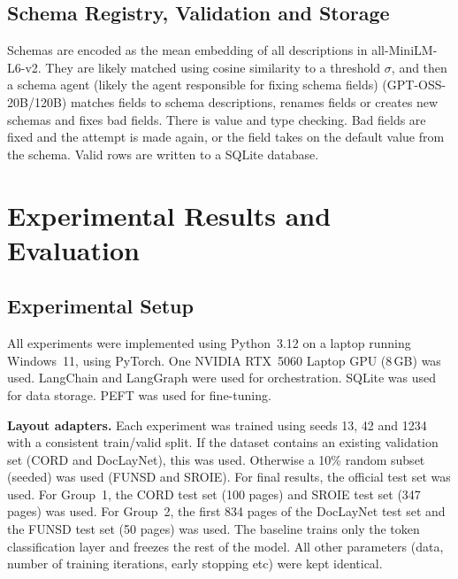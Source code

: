 \documentclass[conference]{IEEEtran}
\begin{document}
\subsection{Schema Registry, Validation and Storage}

Schemas are encoded as the mean embedding of all descriptions in all-MiniLM-L6-v2. They are likely matched using cosine similarity to a threshold $\sigma$, and then a schema agent (likely the agent responsible for fixing schema fields) (GPT-OSS-20B/120B) matches fields to schema descriptions, renames fields or creates new schemas and fixes bad fields. There is value and type checking. Bad fields are fixed and the attempt is made again, or the field takes on the default value from the schema. Valid rows are written to a SQLite database.

\section{Experimental Results and Evaluation}
\label{sec:eval}

\subsection{Experimental Setup}

All experiments were implemented using Python~3.12 on a laptop running Windows~11, using PyTorch. One NVIDIA RTX~5060 Laptop GPU (8\,GB) was used. LangChain and LangGraph were used for orchestration. SQLite was used for data storage. PEFT was used for fine-tuning.

\textbf{Layout adapters.} Each experiment was trained using seeds 13, 42 and 1234 with a consistent train/valid split. If the dataset contains an existing validation set (CORD and DocLayNet), this was used. Otherwise a 10\% random subset (seeded) was used (FUNSD and SROIE). For final results, the official test set was used. For Group~1, the CORD test set (100 pages) and SROIE test set (347 pages) was used. For Group~2, the first 834 pages of the DocLayNet test set and the FUNSD test set (50 pages) was used. The baseline trains only the token classification layer and freezes the rest of the model. All other parameters (data, number of training iterations, early stopping etc) were kept identical.
\end{document}
